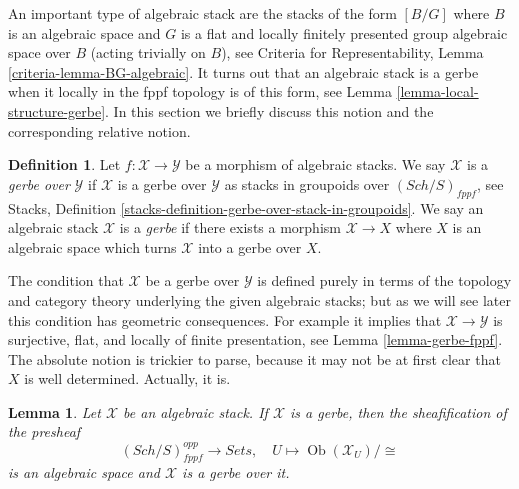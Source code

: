 \documentclass{stacks-project}
\theoremstyle{plain}
\newtheorem{lemma}[subsection]{Lemma}
\theoremstyle{definition}
\newtheorem{definition}[subsection]{Definition}
\theoremstyle{remark}
\numberwithin{equation}{subsection}
\def\Sch{\mathit{Sch}}
\def\Ob{\mathop{\mathrm{Ob}}\nolimits}
\begin{document}
\noindent
An important type of algebraic stack are the stacks of the
form $[B/G]$ where $B$ is an algebraic space and $G$ is a flat
and locally finitely presented group algebraic space over $B$
(acting trivially on $B$), see
Criteria for Representability, Lemma \ref{criteria-lemma-BG-algebraic}.
It turns out that an algebraic stack is a gerbe when it locally in the
fppf topology is of this form, see
Lemma \ref{lemma-local-structure-gerbe}.
In this section we briefly discuss this notion and the corresponding
relative notion.

\begin{definition}
\label{definition-gerbe}
Let $f : \mathcal{X} \to \mathcal{Y}$ be a morphism of algebraic stacks.
We say $\mathcal{X}$ is a {\it gerbe over} $\mathcal{Y}$ if
$\mathcal{X}$ is a gerbe over $\mathcal{Y}$ as stacks
in groupoids over $(\Sch/S)_{fppf}$, see
Stacks, Definition \ref{stacks-definition-gerbe-over-stack-in-groupoids}.
We say an algebraic stack $\mathcal{X}$ is a {\it gerbe} if there exists
a morphism $\mathcal{X} \to X$ where $X$ is an algebraic space which
turns $\mathcal{X}$ into a gerbe over $X$.
\end{definition}

\noindent
The condition that $\mathcal{X}$ be a gerbe over $\mathcal{Y}$ is defined
purely in terms of the topology and category theory underlying the given
algebraic stacks; but as we will see later this condition has
geometric consequences. For example it implies that
$\mathcal{X} \to \mathcal{Y}$ is surjective, flat, and
locally of finite presentation, see
Lemma \ref{lemma-gerbe-fppf}.
The absolute notion is trickier to parse, because it
may not be at first clear that $X$ is well determined. Actually, it is.

\begin{lemma}
\label{lemma-gerbe-over-iso-classes}
Let $\mathcal{X}$ be an algebraic stack. If $\mathcal{X}$ is a gerbe, then
the sheafification of the presheaf
$$
(\Sch/S)_{fppf}^{opp} \to \textit{Sets}, \quad
U \mapsto \Ob(\mathcal{X}_U)/\!\!\cong
$$
is an algebraic space and $\mathcal{X}$ is a gerbe over it.
\end{lemma}
\end{document}
